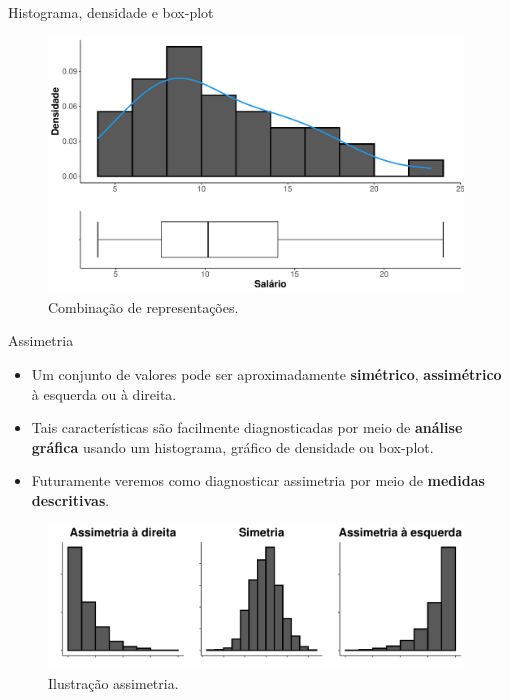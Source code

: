\documentclass[
  ignorenonframetext,
  serif,
  professionalfont,
  usenames,
  dvipsnames,
  aspectratio = 169]{beamer}
\begin{document}
\begin{frame}{Histograma, densidade e box-plot}
\label{histograma-densidade-e-box-plot}
\begin{figure}

{\centering \includegraphics[width=11cm]{encontro1_files/figure-beamer/unnamed-chunk-54-1} 

}

\caption{Combinação de representações.}\label{fig:unnamed-chunk-54}
\end{figure}
\end{frame}

\begin{frame}{Assimetria}
\label{assimetria}
\begin{itemize}
\item
  Um conjunto de valores pode ser aproximadamente \textbf{simétrico},
  \textbf{assimétrico} à esquerda ou à direita.
\item
  Tais características são facilmente diagnosticadas por meio de
  \textbf{análise gráfica} usando um histograma, gráfico de densidade ou
  box-plot.
\item
  Futuramente veremos como diagnosticar assimetria por meio de
  \textbf{medidas descritivas}.
\end{itemize}

\begin{figure}

{\centering \includegraphics[width=11cm]{encontro1_files/figure-beamer/unnamed-chunk-55-1} 

}

\caption{Ilustração assimetria.}\label{fig:unnamed-chunk-55}
\end{figure}
\end{frame}
\end{document}
